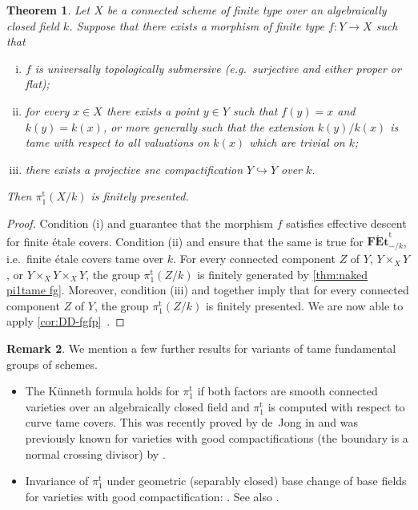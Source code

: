 \documentclass[a4paper,twoside,11pt,reqno]{amsart}
\newcommand{\cat}[1]{\mathbf{#1}}
\newcommand{\pitame}{\pi_1^{\mathrm{t}}}
\newcommand{\FEtt}{{\cat{F\acute{E}t}}^{\!\mathrm{t}}}
\newtheorem{thm}{Theorem}[subsection]
\theoremstyle{definition}
\newtheorem{rmk}[thm]{Remark}
\numberwithin{equation}{subsection}
\begin{document}
\begin{thm} \label{thm:naked pi1tame fp}
    Let $X$ be a connected scheme of finite type over an algebraically closed field $k$. Suppose that there exists a morphism of finite type $f\colon Y\to X$ such that 
    \begin{enumerate}[(i)]
        \item 
        $f$ is universally topologically submersive (e.g.\ surjective and either proper or flat);
        
        \item 
        for every $x\in X$ there exists a point $y\in Y$ such that $f(y)=x$ and $k(y)=k(x)$, or more generally such that the extension $k(y)/k(x)$ is tame with respect to all valuations on $k(x)$ which are trivial on $k$;
        
        \item 
        there exists a projective snc compactification $Y \hookrightarrow \overline{Y}$ over $k$.
    \end{enumerate}
     Then $\pitame(X/k)$ is finitely presented.
\end{thm}

\begin{proof}
Condition (i) and  guarantee that the morphism $f$ satisfies effective descent for finite \'etale covers. Condition (ii) and  ensure that the same is true for $\FEtt_{-/k}$, i.e.\ finite \'etale covers tame over $k$. For every connected component $Z$ of $Y$, $Y\times_X Y$, or $Y\times_X Y\times_X Y$, the group $\pitame(Z/k)$ is finitely generated by \cref{thm:naked pi1tame fg}. Moreover, condition (iii) and \cite[Theorem~1.1]{EsnaultShustermanSrinivas2022:FinitePresentationTame} together imply that for every connected component $Z$ of $Y$, the group $\pitame(Z/k)$ is finitely presented. We are now able to apply \cref{cor:DD-fgfp}~.
\end{proof}

\begin{rmk}
    We mention a few further results for variants of tame fundamental groups of schemes.
    \begin{itemize}
        \item 
        The K\"unneth formula holds for $\pitame$ if both factors are smooth connected varieties over an algebraically closed field and $\pitame$ is computed with respect to curve tame covers. This was recently proved by de~Jong in \cite[Theorem A.1]{deJong2026:KuennethForPitameAppendixJLR2026} and was previously known for varieties with good compactifications (the boundary is a normal crossing divisor) by  
        \cite[Th\'eor\`eme~5.1]{Orgogozo2003:AlterationsGroupeFondamental}. 
        \item 
        Invariance of $\pitame$ under geometric (separably closed) base change of base fields for varieties with good compactification: \cite[Remarque~5.3]{Orgogozo2003:AlterationsGroupeFondamental}. See also \cite{Landesman}.
    \end{itemize}
\end{rmk}
\end{document}
